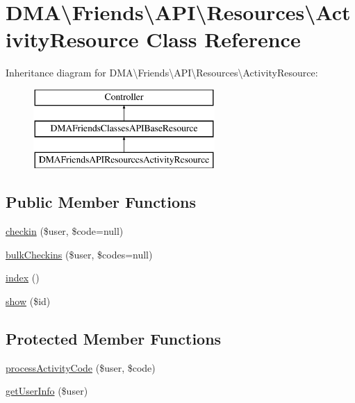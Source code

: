 \hypertarget{classDMA_1_1Friends_1_1API_1_1Resources_1_1ActivityResource}{}\section{D\+M\+A\textbackslash{}Friends\textbackslash{}A\+P\+I\textbackslash{}Resources\textbackslash{}Activity\+Resource Class Reference}
\label{classDMA_1_1Friends_1_1API_1_1Resources_1_1ActivityResource}
Inheritance diagram for D\+M\+A\textbackslash{}Friends\textbackslash{}A\+P\+I\textbackslash{}Resources\textbackslash{}Activity\+Resource\+:\begin{figure}[H]
\begin{center}
\leavevmode
\includegraphics[height=3.000000cm]{dd/df6/classDMA_1_1Friends_1_1API_1_1Resources_1_1ActivityResource}
\end{center}
\end{figure}
\subsection*{Public Member Functions}
\begin{DoxyCompactItemize}
\item 
\hyperlink{classDMA_1_1Friends_1_1API_1_1Resources_1_1ActivityResource_a4eccb55dc505bfc92562fe37db80eda6}{checkin} (\$user, \$code=null)
\item 
\hyperlink{classDMA_1_1Friends_1_1API_1_1Resources_1_1ActivityResource_ab69cc3a390f04db714de20bf7d131eac}{bulk\+Checkins} (\$user, \$codes=null)
\item 
\hyperlink{classDMA_1_1Friends_1_1API_1_1Resources_1_1ActivityResource_a85a8fe2a6fef1e21e6cb4449f9cf0f27}{index} ()
\item 
\hyperlink{classDMA_1_1Friends_1_1API_1_1Resources_1_1ActivityResource_af931d7dc7ee434933464f9fdf4061b38}{show} (\$id)
\end{DoxyCompactItemize}
\subsection*{Protected Member Functions}
\begin{DoxyCompactItemize}
\item 
\hyperlink{classDMA_1_1Friends_1_1API_1_1Resources_1_1ActivityResource_a671a3b78b007929728a958a3d1c1973f}{process\+Activity\+Code} (\$user, \$code)
\item 
\hyperlink{classDMA_1_1Friends_1_1API_1_1Resources_1_1ActivityResource_a6e69dac62efaef2226446bcb4a9537d4}{get\+User\+Info} (\$user)
\end{DoxyCompactItemize}

